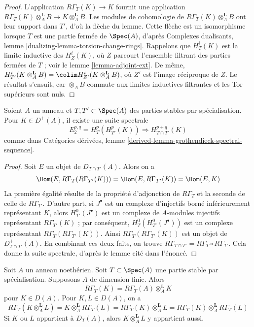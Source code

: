 \begin{proof}
L'application $R\Gamma_T(K) \to K$ fournit une application $R\Gamma_T(K) \otimes_A^\mathbf{L} B \to K \otimes_A^\mathbf{L} B$. Les modules de cohomologie de $R\Gamma_T(K) \otimes_A^\mathbf{L} B$ ont leur support dans $T'$, d'où la flèche du lemme. Cette flèche est un isomorphisme lorsque $T$ est une partie fermée de $\Spec(A)$, d'après Complexes dualisants, lemme \ref{dualizing-lemma-torsion-change-rings}. Rappelons que $H^i_T(K)$ est la limite inductive des $H^i_Z(K)$, où $Z$ parcourt l'ensemble filtrant des parties fermées de $T$ ; voir le lemme \ref{lemma-adjoint-ext}. De même, $H^i_{T'}(K \otimes_A^\mathbf{L} B) =
\colim H^i_{Z'}(K \otimes_A^\mathbf{L} B)$, où $Z'$ est l'image réciproque de $Z$. Le résultat s'ensuit, car $\otimes_A B$ commute aux limites inductives filtrantes et les Tor supérieurs sont nuls.
\end{proof}

\begin{lemma}
\label{lemma-local-cohomology-ss}
Soient $A$ un anneau et $T, T' \subset \Spec(A)$ des parties stables par spécialisation. Pour $K \in D^+(A)$, il existe une suite spectrale
$$
E_2^{p, q} = H^p_T(H^p_{T'}(K)) \Rightarrow H^{p + q}_{T \cap T'}(K)
$$
comme dans Catégories dérivées, lemme \ref{derived-lemma-grothendieck-spectral-sequence}.
\end{lemma}

\begin{proof}
Soit $E$ un objet de $D_{T \cap T'}(A)$. Alors on a
$$
\Hom(E, R\Gamma_T(R\Gamma_{T'}(K))) =
\Hom(E, R\Gamma_{T'}(K)) =
\Hom(E, K)
$$
La première égalité résulte de la propriété d'adjonction de $R\Gamma_T$ et la seconde de celle de $R\Gamma_{T'}$. D'autre part, si $J^\bullet$ est un complexe d'injectifs borné inférieurement représentant $K$, alors $H^0_{T'}(J^\bullet)$ est un complexe de $A$-modules injectifs représentant $R\Gamma_{T'}(K)$ ; par conséquent, $H^0_T(H^0_{T'}(J^\bullet))$ est un complexe représentant $R\Gamma_T(R\Gamma_{T'}(K))$. Ainsi $R\Gamma_T(R\Gamma_{T'}(K))$ est un objet de $D^+_{T \cap T'}(A)$. En combinant ces deux faits, on trouve $R\Gamma_{T \cap T'} = R\Gamma_T \circ R\Gamma_{T'}$. Cela donne la suite spectrale, d'après le lemme cité dans l'énoncé.
\end{proof}

\begin{lemma}
\label{lemma-torsion-tensor-product}
Soit $A$ un anneau noethérien. Soit $T \subset \Spec(A)$ une partie stable par spécialisation. Supposons $A$ de dimension finie. Alors
$$
R\Gamma_T(K) = R\Gamma_T(A) \otimes_A^\mathbf{L} K
$$
pour $K \in D(A)$. Pour $K, L \in D(A)$, on a
$$
R\Gamma_T(K \otimes_A^\mathbf{L} L) =
K \otimes_A^\mathbf{L} R\Gamma_T(L) =
R\Gamma_T(K) \otimes_A^\mathbf{L} L =
R\Gamma_T(K) \otimes_A^\mathbf{L} R\Gamma_T(L)
$$
Si $K$ ou $L$ appartient à $D_T(A)$, alors $K \otimes_A^\mathbf{L} L$ y appartient aussi.
\end{lemma}

